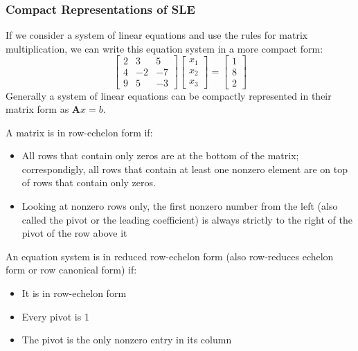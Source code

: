 \subsubsection{Compact Representations of SLE}
If we consider a system of linear equations and use the rules for matrix multiplication, we can write this equation system in a more compact form:
\[
    \begin{bmatrix}
        2 & 3 & 5 \\
        4 & -2 & -7 \\
        9 & 5 & -3
    \end{bmatrix}
    \begin{bmatrix}
        x_1 \\
        x_2\\
        x_3
    \end{bmatrix}
    =
    \begin{bmatrix}
        1 \\
        8\\
        2
    \end{bmatrix}
\]
Generally a system of linear equations can be compactly represented in their matrix form as $\mathbf{A}x=b$.\\
\begin{definition}
    A matrix is in row-echelon form if:
    \begin{itemize}
        \item All rows that contain only zeros are at the bottom of the matrix; correspondigly, all rows that contain at least one nonzero element are on top of rows that contain only zeros.
        \item Looking at nonzero rows only, the first nonzero number from the left (also called the pivot or the leading coefficient) is always strictly to the right of the pivot of the row above it
    \end{itemize}
\end{definition}
\begin{remark} An equation system is in reduced row-echelon form (also row-reduces echelon form or row canonical form) if:
    \begin{itemize}
        \item It is in row-echelon form
        \item Every pivot is 1
        \item The pivot is the only nonzero entry in its column
    \end{itemize}
\end{remark}

